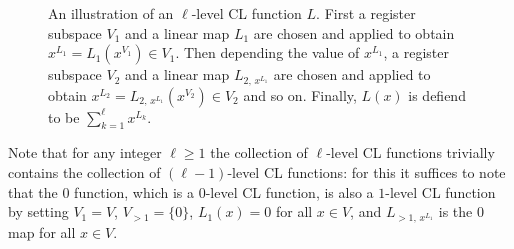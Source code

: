\begin{figure}[!htbp]
  \centering
  \caption{An illustration of an $\ell$-level CL function $L$.
    First a register subspace $V_{1}$ and a linear map $L_{1}$ are chosen and
    applied to obtain $x^{L_{1}} = L_{1}(x^{V_{1}}) \in V_{1}$.
    Then depending the value of $x^{L_{1}}$, a register subspace $V_{2}$ and a
    linear map $L_{2,\,x^{L_{1}}}$ are chosen and applied to obtain
    $x^{L_{2}} = L_{2,\,x^{{L_{1}}}}(x^{V_{2}}) \in V_{2}$ and so on.
    Finally, $L(x)$ is defiend to be
    $\sum_{k=1}^{\ell} x^{L_{k}}$.}\label{fig:cl-functions}
\end{figure}

\begin{remark}
  \label{rk:higher-level}
  Note that for any integer $\ell\geq 1$ the collection of $\ell$-level CL
  functions trivially contains the collection of $(\ell-1)$-level CL functions:
  for this it suffices to note that the $0$ function, which is a $0$-level CL
  function, is also a $1$-level CL function by setting $V_1=V$, $V_{>1}= \{0\}$,
  $L_1(x)=0$ for all $x\in V$, and $L_{>1,\, x^{L_1}}$ is the $0$ map for all
  $x\in V$.
\end{remark}

